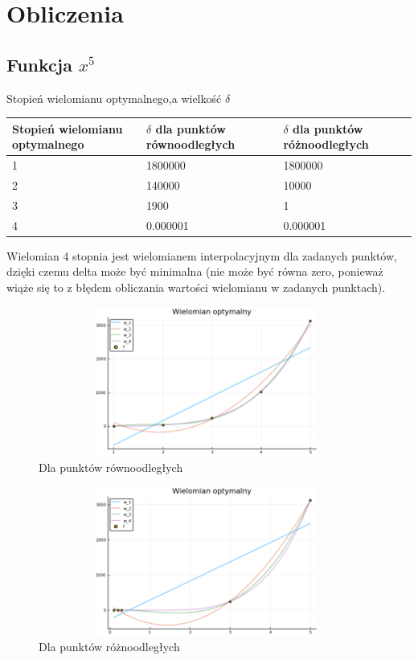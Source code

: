 \documentclass{article}
\begin{document}
\section{Obliczenia}

\subsection{Funkcja $x^5$}
Stopień wielomianu optymalnego,a wielkość $\delta$
\begin{center}
    \begin{tabular}{ |p{3cm}|p{4.6cm}|p{4.6cm}|}
     \hline
     Stopień wielomianu optymalnego & $\delta$ dla punktów równoodległych & $\delta$ dla punktów różnoodległych\\
     \hline
     1 & 1800000 & 1800000\\
     \hline
     2 & 140000 & 10000\\
     \hline
     3 & 1900 & 1\\
     \hline
     4 & 0.000001 & 0.000001\\
     \hline
    \end{tabular}
\end{center}
Wielomian 4 stopnia jest wielomianem interpolacyjnym dla zadanych punktów, dzięki czemu delta może być minimalna (nie może być równa zero, ponieważ wiąże się to z błędem obliczania wartości wielomianu w zadanych punktach).
\begin{figure}[h]
\centering
\includegraphics[width=11cm,height=4.91cm]{xpot5.png}
\caption{Dla punktów równoodległych}
\end{figure}

\begin{figure}[h]
\centering
\includegraphics[width=11cm,height=4.91cm]{xpot52.png}
\caption{Dla punktów różnoodległych}
\end{figure}
\end{document}
